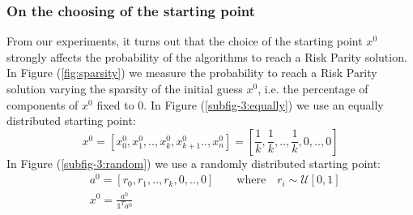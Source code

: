 \subsubsection{On the choosing of the starting point}
From our experiments, it turns out that the choice of the starting point $x^0$ strongly affects the probability of the algorithms to reach a Risk Parity solution.  In Figure (\ref{fig:sparsity}) we measure the probability to reach a Risk Parity solution varying the sparsity of the initial guess $x^0$, i.e. the percentage of components of $x^0$ fixed to 0. In Figure (\ref{subfig-3:equally}) we use an equally distributed starting point:
\begin{equation}
x^{0} = \left[x^{0}_0, x^{0}_1, .. ,  x^{0}_k, x^{0}_{k+1} .., x^{0}_n \right] = \left[\frac{1}{k}, \frac{1}{k}, .., \frac{1}{k}, 0, .., 0 \right]
\end{equation}
In Figure (\ref{subfig-3:random}) we use a randomly distributed starting point:
\begin{equation}
\begin{aligned}
&a^{0} = \left[r_0, r_1, ..,r_k, 0, .., 0 \right] \qquad \text{where} \quad r_i \sim \mathcal{U}[0,1]\\
&x^0 = \frac{a^{0}}{\mathds{1}^T a^0}
\end{aligned}
\end{equation}

